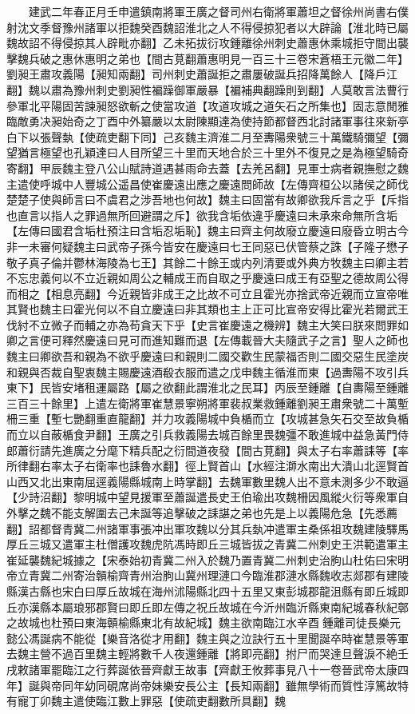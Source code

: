 　　建武二年春正月壬申遣鎮南將軍王廣之督司州右衛將軍蕭坦之督徐州尚書右僕射沈文季督豫州諸軍以拒魏癸酉魏詔淮北之人不得侵掠犯者以大辟論【淮北時已屬魏故詔不得侵掠其人辟毗亦翻】乙未拓拔衍攻鍾離徐州刺史蕭惠休乘城拒守間出襲擊魏兵破之惠休惠明之弟也【間古莧翻蕭惠明見一百三十三卷宋蒼梧王元徽二年】劉昶王肅攻義陽【昶知兩翻】司州刺史蕭誕拒之肅屢破誕兵招降萬餘人【降戶江翻】魏以肅為豫州刺史劉昶性褊躁御軍嚴暴【褊補典翻躁則到翻】人莫敢言法曹行參軍北平陽固苦諫昶怒欲斬之使當攻道【攻道攻城之道矢石之所集也】固志意閒雅臨敵勇决昶始奇之丁酉中外纂嚴以太尉陳顯達為使持節都督西北討諸軍事往來新亭白下以張聲埶【使疏吏翻下同】己亥魏主濟淮二月至夀陽衆號三十萬鐵騎彌望【彌望猶言極望也孔穎達曰人目所望三十里而天地合於三十里外不復見之是為極望騎奇寄翻】甲辰魏主登八公山賦詩道遇甚雨命去蓋【去羌呂翻】見軍士病者親撫慰之魏主遣使呼城中人豐城公遥昌使崔慶遠出應之慶遠問師故【左傳齊桓公以諸侯之師伐楚楚子使與師言曰不虞君之涉吾地也何故】魏主曰固當有故卿欲我斥言之乎【斥指也直言以指人之罪過無所回避謂之斥】欲我含垢依違乎慶遠曰未承來命無所含垢【左傳曰國君含垢杜預注曰含垢忍垢恥】魏主曰齊主何故廢立慶遠曰廢昏立明古今非一未審何疑魏主曰武帝子孫今皆安在慶遠曰七王同惡已伏管蔡之誅【子隆子懋子敬子真子倫并鬱林海陵為七王】其餘二十餘王或内列清要或外典方牧魏主曰卿主若不忘忠義何以不立近親如周公之輔成王而自取之乎慶遠曰成王有亞聖之德故周公得而相之【相息亮翻】今近親皆非成王之比故不可立且霍光亦捨武帝近親而立宣帝唯其賢也魏主曰霍光何以不自立慶遠曰非其類也主上正可比宣帝安得比霍光若爾武王伐紂不立微子而輔之亦為苟貪天下乎【史言崔慶遠之機辨】魏主大笑曰朕來問罪如卿之言便可釋然慶遠曰見可而進知難而退【左傳載晉大夫隨武子之言】聖人之師也魏主曰卿欲吾和親為不欲乎慶遠曰和親則二國交歡生民蒙福否則二國交惡生民塗炭和親與否裁自聖衷魏主賜慶遠酒殽衣服而遣之戊申魏主循淮而東【過夀陽不攻引兵東下】民皆安堵租運屬路【屬之欲翻此謂淮北之民耳】丙辰至鍾離【自夀陽至鍾離三百三十餘里】上遣左衛將軍崔慧景寧朔將軍裴叔業救鍾離劉昶王肅衆號二十萬塹柵三重【塹七艷翻重直龍翻】并力攻義陽城中負楯而立【攻城甚急矢石交至故負楯而立以自蔽楯食尹翻】王廣之引兵救義陽去城百餘里畏魏彊不敢進城中益急黃門侍郎蕭衍請先進廣之分麾下精兵配之衍間道夜發【間古莧翻】與太子右率蕭誄等【率所律翻右率太子右衛率也誄魯水翻】徑上賢首山【水經注溮水南出大潰山北逕賢首山西又北出東南屈逕義陽縣城南上時掌翻】去魏軍數里魏人出不意未測多少不敢逼【少詩沼翻】黎明城中望見援軍至蕭誕遣長史王伯瑜出攻魏柵因風縱火衍等衆軍自外擊之魏不能支解圍去己未誕等追擊破之誄諶之弟也先是上以義陽危急【先悉薦翻】詔都督青冀二州諸軍事張冲出軍攻魏以分其兵埶冲遣軍主桑係祖攻魏建陵驛馬厚丘三城又遣軍主杜僧護攻魏虎阬馮時即丘三城皆拔之青冀二州刺史王洪範遣軍主崔延襲魏紀城據之【宋泰始初青冀二州入於魏乃置青冀二州刺史治朐山杜佑曰宋明帝立青冀二州寄治贑榆齊青州治朐山冀州理漣口今臨淮郡漣水縣魏收志郯郡有建陵縣漢古縣也宋白曰厚丘故城在海州沭陽縣北四十五里又東彭城郡龍沮縣有即丘城即丘亦漢縣本屬琅邪郡賢曰即丘即左傳之祝丘故城在今沂州臨沂縣東南紀城春秋紀鄣之故城也杜預曰東海贑榆縣東北有故紀城】魏主欲南臨江水辛酉鍾離司徒長樂元懿公馮誕病不能從【樂音洛從才用翻】魏主與之泣訣行五十里聞誕卒時崔慧景等軍去魏主營不過百里魏主輕將數千人夜還鍾離【將即亮翻】拊尸而哭達旦聲淚不絶壬戌敕諸軍罷臨江之行葬誕依晉齊獻王故事【齊獻王攸葬事見八十一卷晉武帝太康四年】誕與帝同年幼同硯席尚帝妹樂安長公主【長知兩翻】雖無學術而質性淳篤故特有寵丁卯魏主遣使臨江數上罪惡【使疏吏翻數所具翻】魏